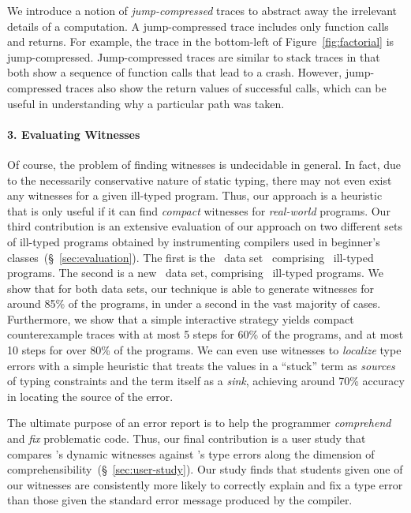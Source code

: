We introduce a notion of \emph{jump-compressed} traces to abstract away
the irrelevant details of a computation.
%
A jump-compressed trace includes only function
calls and returns. For example, the trace in the bottom-left of
Figure~\ref{fig:factorial} is jump-compressed.
%
Jump-compressed traces are similar to stack traces in that both show a
sequence of function calls that lead to a crash. However, jump-compressed
traces also show the return values of successful calls, which can be
useful in understanding why a particular path was taken.

\paragraph{3. Evaluating Witnesses}
%
Of course, the problem of finding witnesses is
undecidable in general. In fact, due to the necessarily
conservative nature of static typing, there
may not even exist any witnesses for a given
ill-typed program.
%
Thus, our approach is a heuristic that is only useful
if it can find \emph{compact} witnesses for
\emph{real-world} programs.
%
Our third contribution is an extensive evaluation of our approach
on two different sets of ill-typed programs obtained by instrumenting
compilers used in beginner's classes~(\S~\ref{sec:evaluation}).
%
The first is the \uwbench\ data set~\cite{Lerner2007-dt}
comprising \uwsize\ ill-typed programs.
%
The second is a new \ucsdbench\ data set, comprising \ucsdsize\
ill-typed programs.
%
We show that for both data sets, our technique is able to generate
witnesses for around 85\% of the programs, in under a second in the
vast majority of cases.
%
Furthermore, we show that a simple interactive strategy yields
compact counterexample traces with at most 5 steps for 60\%
of the programs, and at most 10 steps for over 80\% of the programs.
%
We can even use witnesses to \emph{localize} type errors with a simple
heuristic that treats the values in a ``stuck'' term as \emph{sources}
of typing constraints and the term itself as a \emph{sink},
achieving around 70\% accuracy in locating the source of the error.

The ultimate purpose of an error report is to help the programmer
\emph{comprehend} and \emph{fix} problematic code.
%
Thus, our final contribution is a user study that compares \toolname's
dynamic witnesses against \ocaml's type errors along the dimension of
comprehensibility~(\S~\ref{sec:user-study}).
%
Our study finds that students given one of our witnesses are
consistently more likely to correctly explain and fix a type
error than those given the standard error message produced by
the \ocaml compiler.


